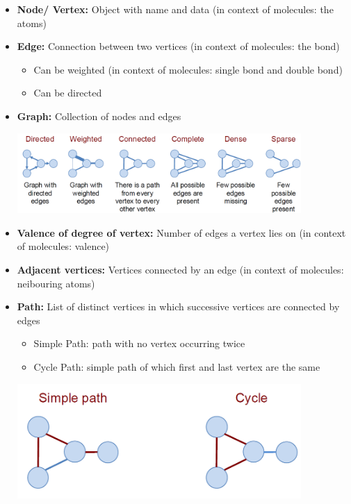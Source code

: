 
\begin{itemize}
    \item \textbf{Node/ Vertex:} Object with name and data (in context of molecules: the atoms)
    \item \textbf{Edge:} Connection between two vertices (in context of molecules: the bond)
    \begin{itemize}
        \item Can be weighted (in context of molecules: single bond and double bond)
        \item Can be directed 
    \end{itemize}
    \item \textbf{Graph:} Collection of nodes and edges
    \begin{center}\includegraphics[width=0.85\textwidth]{img/graphs/DifferentGraphs.png}\end{center}
    \item \textbf{Valence of degree of vertex:} Number of edges a vertex lies on (in context of molecules: valence)
    \item \textbf{Adjacent vertices:} Vertices connected by an edge (in context of molecules: neibouring atoms)
    \item \textbf{Path:} List of distinct vertices in which successive vertices are connected by edges
    \begin{itemize}
        \item Simple Path: path with no vertex occurring twice
        \item Cycle Path: simple path of which first and last vertex are the same
    \end{itemize}
    \begin{center}\includegraphics[width=0.85\textwidth]{img/graphs/PathGraphs.png}\end{center}

\end{itemize}
